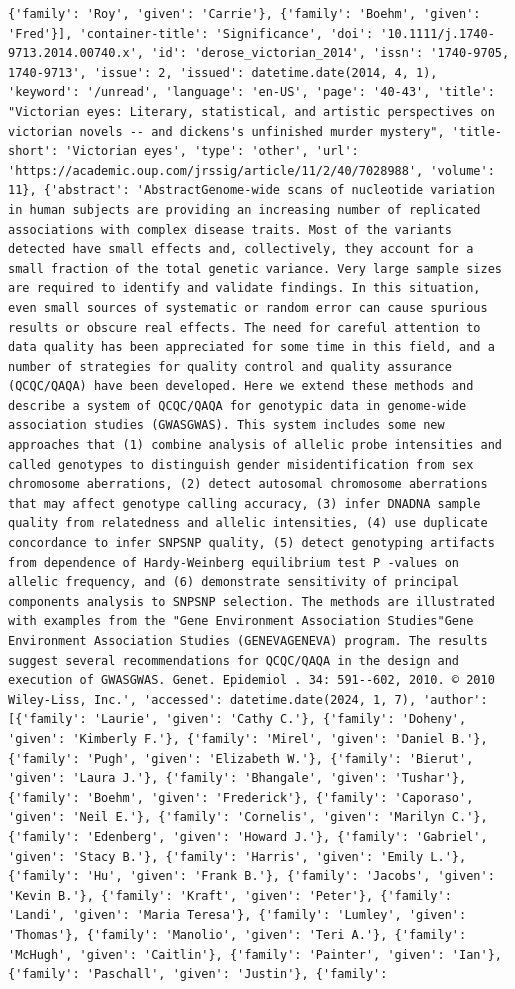 \documentclass[
  12pt,
]
{article}
\begin{document}
\begin{verbatim}
{'family': 'Roy', 'given': 'Carrie'}, {'family': 'Boehm', 'given': 'Fred'}], 'container-title': 'Significance', 'doi': '10.1111/j.1740-9713.2014.00740.x', 'id': 'derose_victorian_2014', 'issn': '1740-9705, 1740-9713', 'issue': 2, 'issued': datetime.date(2014, 4, 1), 'keyword': '/unread', 'language': 'en-US', 'page': '40-43', 'title': "Victorian eyes: Literary, statistical, and artistic perspectives on victorian novels -- and dickens's unfinished murder mystery", 'title-short': 'Victorian eyes', 'type': 'other', 'url': 'https://academic.oup.com/jrssig/article/11/2/40/7028988', 'volume': 11}, {'abstract': 'AbstractGenome‐wide scans of nucleotide variation in human subjects are providing an increasing number of replicated associations with complex disease traits. Most of the variants detected have small effects and, collectively, they account for a small fraction of the total genetic variance. Very large sample sizes are required to identify and validate findings. In this situation, even small sources of systematic or random error can cause spurious results or obscure real effects. The need for careful attention to data quality has been appreciated for some time in this field, and a number of strategies for quality control and quality assurance (QCQC/QAQA) have been developed. Here we extend these methods and describe a system of QCQC/QAQA for genotypic data in genome‐wide association studies (GWASGWAS). This system includes some new approaches that (1) combine analysis of allelic probe intensities and called genotypes to distinguish gender misidentification from sex chromosome aberrations, (2) detect autosomal chromosome aberrations that may affect genotype calling accuracy, (3) infer DNADNA sample quality from relatedness and allelic intensities, (4) use duplicate concordance to infer SNPSNP quality, (5) detect genotyping artifacts from dependence of Hardy‐Weinberg equilibrium test P ‐values on allelic frequency, and (6) demonstrate sensitivity of principal components analysis to SNPSNP selection. The methods are illustrated with examples from the "Gene Environment Association Studies"Gene Environment Association Studies (GENEVAGENEVA) program. The results suggest several recommendations for QCQC/QAQA in the design and execution of GWASGWAS. Genet. Epidemiol . 34: 591--602, 2010. © 2010 Wiley‐Liss, Inc.', 'accessed': datetime.date(2024, 1, 7), 'author': [{'family': 'Laurie', 'given': 'Cathy C.'}, {'family': 'Doheny', 'given': 'Kimberly F.'}, {'family': 'Mirel', 'given': 'Daniel B.'}, {'family': 'Pugh', 'given': 'Elizabeth W.'}, {'family': 'Bierut', 'given': 'Laura J.'}, {'family': 'Bhangale', 'given': 'Tushar'}, {'family': 'Boehm', 'given': 'Frederick'}, {'family': 'Caporaso', 'given': 'Neil E.'}, {'family': 'Cornelis', 'given': 'Marilyn C.'}, {'family': 'Edenberg', 'given': 'Howard J.'}, {'family': 'Gabriel', 'given': 'Stacy B.'}, {'family': 'Harris', 'given': 'Emily L.'}, {'family': 'Hu', 'given': 'Frank B.'}, {'family': 'Jacobs', 'given': 'Kevin B.'}, {'family': 'Kraft', 'given': 'Peter'}, {'family': 'Landi', 'given': 'Maria Teresa'}, {'family': 'Lumley', 'given': 'Thomas'}, {'family': 'Manolio', 'given': 'Teri A.'}, {'family': 'McHugh', 'given': 'Caitlin'}, {'family': 'Painter', 'given': 'Ian'}, {'family': 'Paschall', 'given': 'Justin'}, {'family': 
\end{verbatim}
\end{document}
